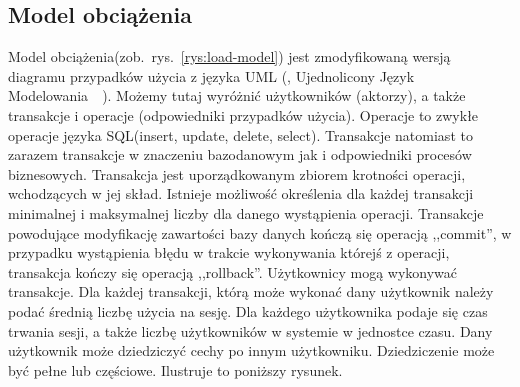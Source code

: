 \subsection{Model obciążenia}
Model obciążenia(zob.~rys.~\ref{rys:load-model}) jest zmodyfikowaną wersją diagramu przypadków użycia z języka UML
(, Ujednolicony Język Modelowania~\cite{UML1}~\cite{UML2}). Możemy tutaj wyróżnić 
użytkowników (aktorzy), a także transakcje i operacje (odpowiedniki przypadków użycia). Operacje to zwykłe operacje 
języka SQL(insert, update, delete, select).
Transakcje natomiast to zarazem transakcje w znaczeniu bazodanowym jak i odpowiedniki procesów biznesowych.
Transakcja jest uporządkowanym zbiorem krotności operacji, wchodzących w jej skład.
Istnieje możliwość określenia dla każdej transakcji minimalnej i maksymalnej liczby dla danego wystąpienia operacji.
Transakcje powodujące modyfikację zawartości bazy danych kończą się operacją ,,commit'', w przypadku wystąpienia
błędu w trakcie wykonywania którejś z operacji, transakcja kończy się operacją ,,rollback''.
Użytkownicy mogą wykonywać transakcje. Dla każdej transakcji, którą może wykonać dany użytkownik
należy podać średnią liczbę użycia na sesję. Dla każdego użytkownika podaje się czas trwania sesji,
a także liczbę użytkowników w systemie w jednostce czasu. Dany użytkownik może dziedziczyć
cechy po innym użytkowniku. Dziedziczenie może być pełne lub częściowe. Ilustruje to poniższy rysunek.

